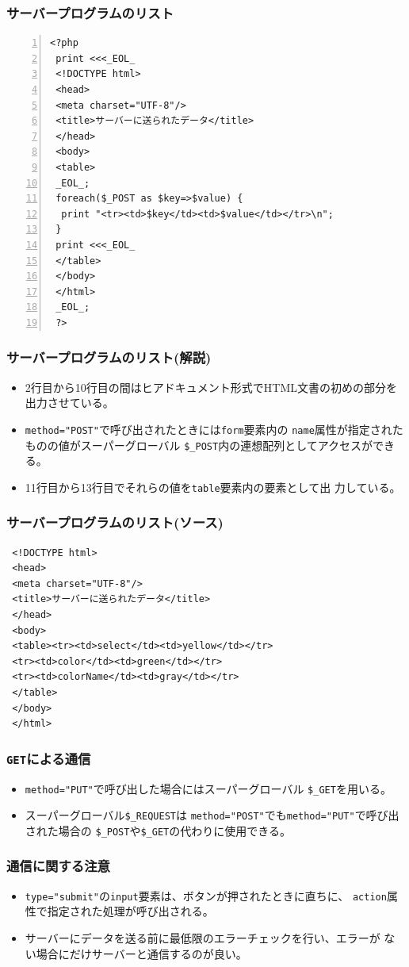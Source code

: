  \begin{frame}[containsverbatim]
 \frametitle{サーバープログラムのリスト}
 \begin{Verbatim}[numbers=left, fontsize=\scriptsize]
 <?php
 print <<<_EOL_
 <!DOCTYPE html>
 <head>
 <meta charset="UTF-8"/>
 <title>サーバーに送られたデータ</title>
 </head>
 <body>
 <table>
 _EOL_;
 foreach($_POST as $key=>$value) {
  print "<tr><td>$key</td><td>$value</td></tr>\n";
 }
 print <<<_EOL_
 </table>
 </body>
 </html>
 _EOL_;
 ?>
 \end{Verbatim}
 \end{frame}
 \begin{frame}[containsverbatim]
 \frametitle{サーバープログラムのリスト(解説)}
 \begin{itemize}
 \item 2行目から10行目の間はヒアドキュメント形式でHTML文書の初めの部分を
       出力させている。
 \item \verb+method="POST"+で呼び出されたときには\texttt{form}要素内の
       \texttt{name}属性が指定されたものの値がスーパーグローバル
       \verb+$_POST+内の連想配列としてアクセスができる。
 \item 11行目から13行目でそれらの値を\texttt{table}要素内の要素として出
       力している。
 \end{itemize}
 \end{frame}
 \begin{frame}[containsverbatim]
 \frametitle{サーバープログラムのリスト(ソース)}
 \begin{Verbatim}
 <!DOCTYPE html>
 <head>
 <meta charset="UTF-8"/>
 <title>サーバーに送られたデータ</title>
 </head>
 <body>
 <table><tr><td>select</td><td>yellow</td></tr>
 <tr><td>color</td><td>green</td></tr>
 <tr><td>colorName</td><td>gray</td></tr>
 </table>
 </body>
 </html>
 \end{Verbatim}
 \end{frame}
 \begin{frame}[containsverbatim]
 \frametitle{\texttt{GET}による通信}
 \begin{itemize}
 \item \Verb+method="PUT"+で呼び出した場合にはスーパーグローバル
 \Verb+$_GET+を用いる。
 \item スーパーグローバル\Verb+$_REQUEST+は
 \Verb+method="POST"+でも\Verb+method="PUT"+で呼び出された場合の
 \Verb+$_POST+や\verb+$_GET+の代わりに使用できる。
 \end{itemize}
 \end{frame}
 \begin{frame}[containsverbatim]
 \frametitle{通信に関する注意}
 \begin{itemize}
 \item \Verb+type="submit"+の\texttt{input}要素は、ボタンが押されたときに直ちに、
 \texttt{action}属性で指定された処理が呼び出される。
 \item サーバーにデータを送る前に最低限のエラーチェックを行い、エラーが
       ない場合にだけサーバーと通信するのが良い。
 \end{itemize}
 \end{frame}
